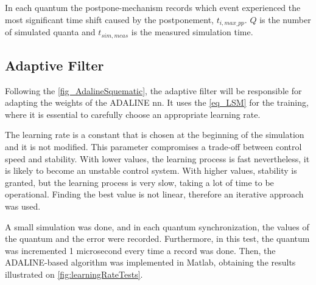 In each quantum the postpone-mechanism records which event experienced the most significant time shift caused by the postponement, 
$t_{i,max\_pp}$. $Q$ is the number of simulated quanta and $t_{sim,meas}$ is the measured simulation time. 


\subsection{Adaptive Filter}

Following the \autoref{fig_AdalineSquematic}, the adaptive filter will be responsible for adapting the weights of the ADALINE \gls{nn}. It uses 
the \autoref{eq_LSM} for the training, where it is essential to carefully choose an appropriate learning rate.

The learning rate is a constant that is chosen at the beginning of the simulation and it is not modified. This parameter compromises a trade-off 
between control speed and stability. With lower values, the learning process is fast nevertheless, it is likely to become an unstable control 
system. With higher values, stability is granted, but the learning process is very slow, taking a lot of time to be operational.
Finding the best value is not linear, therefore an iterative approach was used. 

A small simulation was done, and in each quantum synchronization, the values of the quantum and the error were recorded. Furthermore, 
in this test, the quantum was incremented 1 microsecond every time a record was done. Then, the ADALINE-based algorithm was implemented in Matlab, 
obtaining the results illustrated on \autoref{fig:learningRateTests}.

